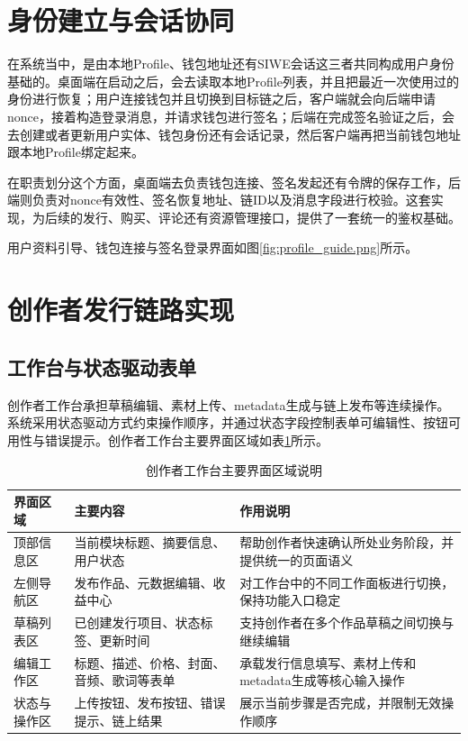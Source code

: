 \section{身份建立与会话协同}

在系统当中，是由本地Profile、钱包地址还有SIWE会话这三者共同构成用户身份基础的。桌面端在启动之后，会去读取本地Profile列表，并且把最近一次使用过的身份进行恢复；用户连接钱包并且切换到目标链之后，客户端就会向后端申请nonce，接着构造登录消息，并请求钱包进行签名；后端在完成签名验证之后，会去创建或者更新用户实体、钱包身份还有会话记录，然后客户端再把当前钱包地址跟本地Profile绑定起来。

在职责划分这个方面，桌面端去负责钱包连接、签名发起还有令牌的保存工作，后端则负责对nonce有效性、签名恢复地址、链ID以及消息字段进行校验。这套实现，为后续的发行、购买、评论还有资源管理接口，提供了一套统一的鉴权基础。

用户资料引导、钱包连接与签名登录界面如图\ref{fig:profile_guide.png}所示。


\section{创作者发行链路实现}

\subsection{工作台与状态驱动表单}

创作者工作台承担草稿编辑、素材上传、metadata生成与链上发布等连续操作。系统采用状态驱动方式约束操作顺序，并通过状态字段控制表单可编辑性、按钮可用性与错误提示。创作者工作台主要界面区域如表\ref{tab:creator_workshop_regions}所示。

\begin{table}[htbp]
    \linespread{1.45}
    \songti
    \centering
    \caption{创作者工作台主要界面区域说明}\label{tab:creator_workshop_regions}
    \begin{tabular}{|l|p{4.0cm}|p{6.1cm}|}
        \hline
        界面区域   & 主要内容                 & 作用说明                            \\ \hline
        顶部信息区  & 当前模块标题、摘要信息、用户状态     & 帮助创作者快速确认所处业务阶段，并提供统一的页面语义      \\ \hline
        左侧导航区  & 发布作品、元数据编辑、收益中心      & 对工作台中的不同工作面板进行切换，保持功能入口稳定       \\ \hline
        草稿列表区  & 已创建发行项目、状态标签、更新时间    & 支持创作者在多个作品草稿之间切换与继续编辑           \\ \hline
        编辑工作区  & 标题、描述、价格、封面、音频、歌词等表单 & 承载发行信息填写、素材上传和metadata生成等核心输入操作 \\ \hline
        状态与操作区 & 上传按钮、发布按钮、错误提示、链上结果  & 展示当前步骤是否完成，并限制无效操作顺序            \\ \hline
    \end{tabular}
\end{table}

